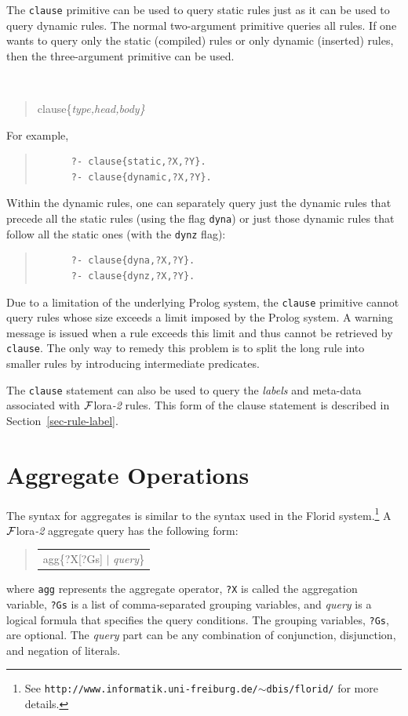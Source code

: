 \documentclass[11pt]{article}
\newenvironment{qrules}{\begin{quote}\tt\begin{tabular}[t]{l}}%
{\end{tabular}\end{quote}}
\newcommand{\FLORA}{{\mbox{\sc ${\cal F}${lora}\rm\emph{-2}}}\xspace}
\newcommand{\FLORID}{{\mbox{\sc Florid}}\xspace}
\begin{document}
The {\tt clause} primitive can be used to query static rules just as it can
be used to query dynamic rules.
The normal two-argument primitive queries all rules. If one wants to query
only the static (compiled) rules or only dynamic (inserted) rules, then the
three-argument primitive can be used.
{\tt
\begin{quote}
clause\{\it{type,head,body}\}
\end{quote}
}
\noindent
For example,
\begin{quote}
\begin{verbatim}
      ?- clause{static,?X,?Y}.
      ?- clause{dynamic,?X,?Y}.
\end{verbatim}
\end{quote}
Within the dynamic rules, one can separately query just the dynamic rules
that precede all the static rules (using the flag {\tt dyna}) or just those
dynamic rules that follow all the static ones (with the {\tt dynz} flag):
\begin{quote}
\begin{verbatim}
      ?- clause{dyna,?X,?Y}.
      ?- clause{dynz,?X,?Y}.
\end{verbatim}
\end{quote}

Due to a limitation of the underlying Prolog system, the {\tt clause}
primitive cannot query rules whose size exceeds a limit imposed by the
Prolog system.  A warning message is issued when a rule exceeds this limit
and thus cannot be retrieved by {\tt clause}.  The only way to remedy this
problem is to split the long rule into smaller rules by introducing
intermediate predicates.

The {\tt clause} statement can also be used to query the \emph{labels} and
meta-data associated with \FLORA rules. This form of the clause statement
is described in Section~\ref{sec-rule-label}.


\section{Aggregate Operations}
\label{sec-aggregates}


The syntax for aggregates is similar to the syntax used in the \FLORID
system.\footnote{
  See {\tt http://www.informatik.uni-freiburg.de/$\sim$dbis/florid/} for more
  details.
}
A \FLORA aggregate query has the following form:
\begin{qrules}
agg\{?X[?Gs] $|$ {\it query}\}
\end{qrules}
%
where {\tt agg} represents the aggregate operator, {\tt ?X} is called the
aggregation variable, {\tt ?Gs} is a list of comma-separated grouping
variables, and {\it query} is a logical formula that specifies the
query conditions. The grouping variables, {\tt ?Gs}, are optional. The {\it
query} part
can be any combination of conjunction, disjunction, and negation of literals.
\end{document}
